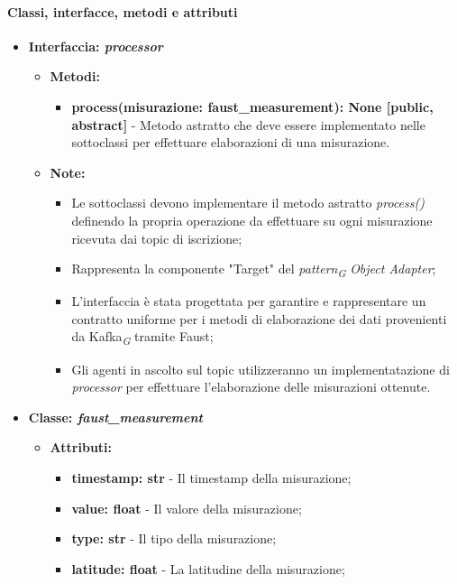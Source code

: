 \paragraph*{Classi, interfacce, metodi e attributi}
\begin{itemize}
    \item{\textbf{Interfaccia: \textit{processor}}}
    \begin{itemize}
    \item\textbf{Metodi: }
    \begin{itemize}
        \item \textbf{process(misurazione: faust\_measurement): None [public, abstract]} - Metodo astratto che deve essere implementato nelle sottoclassi per effettuare elaborazioni di una misurazione.
    \end{itemize}
    \item\textbf{Note:}
        \begin{itemize}
            \item  Le sottoclassi devono implementare il metodo astratto \textit{process()} definendo la propria operazione da effettuare su ogni misurazione ricevuta dai topic di iscrizione;
            \item Rappresenta la componente "Target" del \textit{pattern}\textsubscript{\textit{G}} \textit{Object Adapter};
            \item L'interfaccia è stata progettata per garantire e rappresentare un contratto uniforme per i metodi di elaborazione dei dati provenienti da Kafka\textsubscript{\textit{G}} tramite Faust;
            \item Gli agenti in ascolto sul topic utilizzeranno un implementatazione di \textit{processor} per effettuare l'elaborazione delle misurazioni ottenute.
        \end{itemize}
    \end{itemize}
    \item{\textbf{Classe: \textit{faust\_measurement}}}
    \begin{itemize}
    \item\textbf{Attributi:}
        \begin{itemize}
        \item \textbf{timestamp: str} - Il timestamp della misurazione;
        \item \textbf{value: float} - Il valore della misurazione;
        \item \textbf{type: str} - Il tipo della misurazione;
        \item \textbf{latitude: float} - La latitudine della misurazione;

\end{itemize}
\end{itemize}
\end{itemize}
